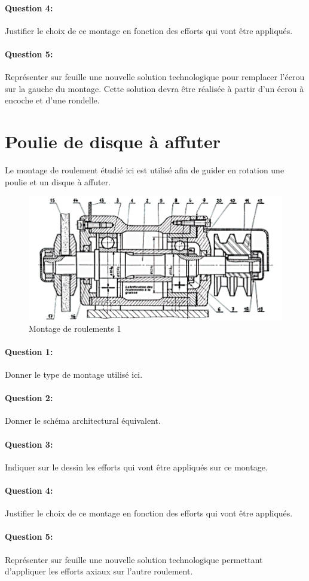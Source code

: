 \paragraph{Question 4:} Justifier le choix de ce montage en fonction des efforts qui vont être appliqués.

\paragraph{Question 5:} Représenter sur feuille une nouvelle solution technologique pour remplacer l'écrou sur la gauche du montage. Cette solution devra être réalisée à partir d'un écrou à encoche et d'une rondelle.

\newpage

\section{Poulie de disque à affuter}

Le montage de roulement étudié ici est utilisé afin de guider en rotation une poulie et un disque à affuter.

\begin{figure}[!h]
	\begin{center}
	\includegraphics[width=0.6\linewidth]{img/Picture3}
		\caption{Montage de roulements 1}
		\label{fig:image1}
	\end{center}
\end{figure}

\paragraph{Question 1:} Donner le type de montage utilisé ici.

\paragraph{Question 2:} Donner le schéma architectural équivalent.

\paragraph{Question 3:} Indiquer sur le dessin les efforts qui vont être appliqués sur ce montage.

\paragraph{Question 4:} Justifier le choix de ce montage en fonction des efforts qui vont être appliqués.

\paragraph{Question 5:} Représenter sur feuille une nouvelle solution technologique permettant d'appliquer les efforts axiaux sur l'autre roulement.


